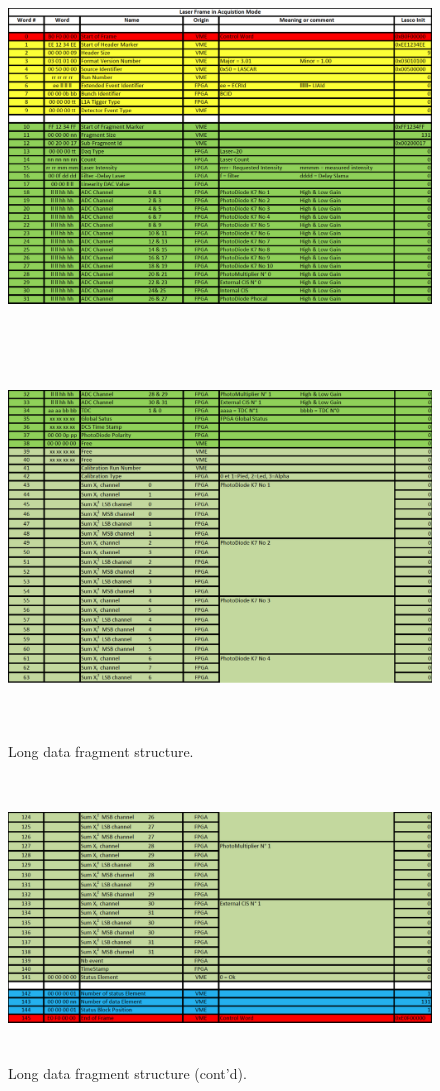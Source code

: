\begin{appendices}
\begin{figure}[htbp]
\centering
\includegraphics[height=10cm]{figures/long_fragment_1.pdf}
\includegraphics[height=9.9cm]{figures/long_fragment_2.pdf}
\caption{Long data fragment structure.}\label{fig:longfraga}
\end{figure}

\begin{figure}[htbp]
\centering
\includegraphics[height=7.5cm]{figures/long_fragment_3.pdf}
\caption{Long data fragment structure (cont'd).}\label{fig:longfragb}
\end{figure}


\end{appendices}
